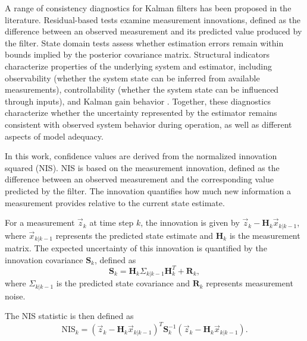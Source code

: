 A range of consistency diagnostics for Kalman filters has been proposed in the literature. Residual-based tests examine measurement innovations, defined as the difference between an observed measurement and its predicted value produced by the filter. State domain tests assess whether estimation errors remain within bounds implied by the posterior covariance matrix. Structural indicators characterize properties of the underlying system and estimator, including observability (whether the system state can be inferred from available measurements), controllability (whether the system state can be influenced through inputs), and Kalman gain behavior \cite{bar2001estimation,gamse2014statistical,piche2016online, griebel2020kalman}. Together, these diagnostics characterize whether the uncertainty represented by the estimator remains consistent with observed system behavior during operation, as well as different aspects of model adequacy.



In this work, confidence values are derived from the normalized innovation squared (NIS). NIS is based on the measurement innovation, defined as the difference between an observed measurement and the corresponding value predicted by the filter. The innovation quantifies how much new information a measurement provides relative to the current state estimate.

For a measurement $\vec{z}_k$ at time step $k$, the innovation is given by $\vec{z}_k - \mathbf{H}_k \vec{x}_{k|k-1}$, where $\vec{x}_{k|k-1}$ represents the predicted state estimate and $\mathbf{H}_k$ is the measurement matrix. The expected uncertainty of this innovation is quantified by the innovation covariance $\mathbf{S}_k$, defined as
\[
\mathbf{S}_k = \mathbf{H}_k \Sigma_{k|k-1} \mathbf{H}_k^{T} + \mathbf{R}_k,
\]
where $\Sigma_{k|k-1}$ is the predicted state covariance and $\mathbf{R}_k$ represents measurement noise.

The NIS statistic is then defined as
\[
\mathrm{NIS}_k =
\left( \vec{z}_k - \mathbf{H}_k \vec{x}_{k|k-1} \right)^{T}
\mathbf{S}_k^{-1}
\left( \vec{z}_k - \mathbf{H}_k \vec{x}_{k|k-1} \right).
\]

